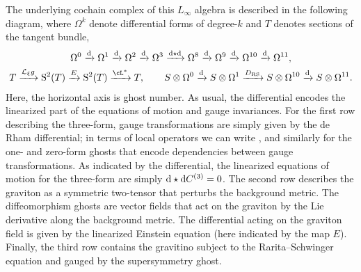 \documentclass[pdftex]{sigma}
\numberwithin{equation}{section}
\theoremstyle{definition}
\def\d{{\rm d}}
\begin{document}
The underlying cochain complex of this $L_\infty$ algebra is described in the following diagram, where $\Omega^{k}$ denote differential forms of degree-$k$ and $T$ denotes sections of the tangent bundle,
\begin{gather}
\Omega^{0} \xrightarrow{\d}
\Omega^{1} \xrightarrow{\d}
\Omega^{2} \xrightarrow{\d}
\Omega^{3} \xrightarrow{\d \star \d}
\Omega^{8} \xrightarrow{\d}
\Omega^{9} \xrightarrow{\d}
\Omega^{10} \xrightarrow{\d}
\Omega^{11},\nonumber
\\
T \xrightarrow{\mathcal{L}_\xi g}
\mathrm{S}^2(T) \xrightarrow{E}
\mathrm{S}^2(T) \xrightarrow{\cL^*}
T,\qquad
S \otimes \Omega^0 \xrightarrow{\d}
S \otimes \Omega^1 \xrightarrow{D_{\rm RS}}
S \otimes \Omega^{10} \xrightarrow{\d}
S \otimes \Omega^{11}.\label{eq: sugrafields}
\end{gather}
Here, the horizontal axis is ghost number.
As usual, the differential encodes the linearized part of the equations of motion and gauge invariances. For the first row describing the three-form, gauge transformations are simply given by the de Rham differential; in terms of local operators we can write
\smash{$
 \delta C^{(3)} = \d C^{(2)}$},
and similarly for the one- and zero-form ghosts that encode dependencies between gauge transformations. As indicated by the differential, the linearized equations of motion for the three-form are simply $\d \star \d C^{(3)}=0$.
The second row describes the graviton as a symmetric two-tensor that perturbs the background metric. The diffeomorphism ghosts are vector fields that act on the graviton by the Lie derivative along the background metric. The differential acting on the graviton field is given by the linearized Einstein equation (here indicated by the map $E$).
Finally, the third row contains the gravitino subject to the Rarita--Schwinger equation and gauged by the supersymmetry ghost.
\end{document}
